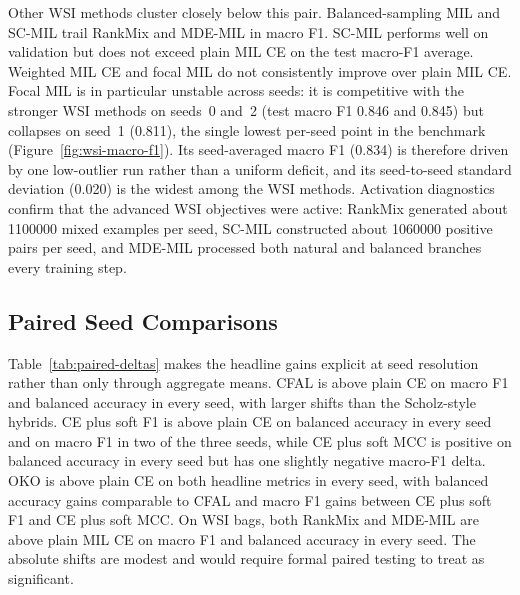 \documentclass[11pt]{article}
\begin{document}
Other WSI methods cluster closely below this pair. Balanced-sampling MIL and SC-MIL trail RankMix and MDE-MIL in macro F1. SC-MIL performs well on validation but does not exceed plain MIL CE on the test macro-F1 average. Weighted MIL CE and focal MIL do not consistently improve over plain MIL CE. Focal MIL is in particular unstable across seeds: it is competitive with the stronger WSI methods on seeds~0 and~2 (test macro F1 \num{0.846} and \num{0.845}) but collapses on seed~1 (\num{0.811}), the single lowest per-seed point in the benchmark (Figure~\ref{fig:wsi-macro-f1}). Its seed-averaged macro F1 (\num{0.834}) is therefore driven by one low-outlier run rather than a uniform deficit, and its seed-to-seed standard deviation (\num{0.020}) is the widest among the WSI methods. Activation diagnostics confirm that the advanced WSI objectives were active: RankMix generated about \num{1100000} mixed examples per seed, SC-MIL constructed about \num{1060000} positive pairs per seed, and MDE-MIL processed both natural and balanced branches every training step.

\subsection{Paired Seed Comparisons}
Table~\ref{tab:paired-deltas} makes the headline gains explicit at seed resolution rather than only through aggregate means. CFAL is above plain CE on macro F1 and balanced accuracy in every seed, with larger shifts than the Scholz-style hybrids. CE plus soft F1 is above plain CE on balanced accuracy in every seed and on macro F1 in two of the three seeds, while CE plus soft MCC is positive on balanced accuracy in every seed but has one slightly negative macro-F1 delta. OKO is above plain CE on both headline metrics in every seed, with balanced accuracy gains comparable to CFAL and macro F1 gains between CE plus soft F1 and CE plus soft MCC. On WSI bags, both RankMix and MDE-MIL are above plain MIL CE on macro F1 and balanced accuracy in every seed. The absolute shifts are modest and would require formal paired testing to treat as significant.
\end{document}

